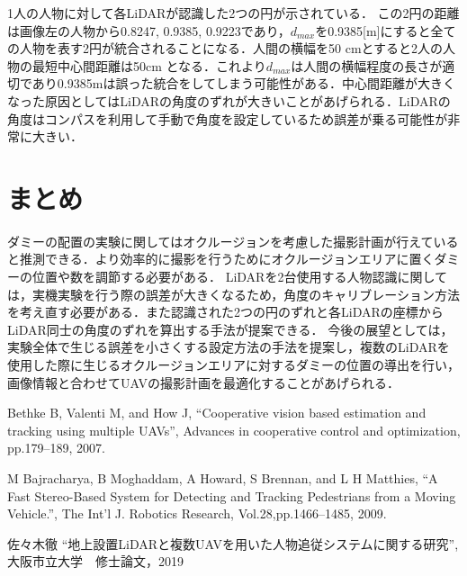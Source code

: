 \documentclass[autodetect-engine,dvipdfmx-if-dvi,ja=standard,a4j,jbase=10.5pt,twoside,twocolumn,magstyle=nomag*]{bxjsarticle}
\begin{document}
1人の人物に対して各LiDARが認識した2つの円が示されている．
この2円の距離は画像左の人物から0.8247, 0.9385, 0.9223であり，$d_{max}$を0.9385[m]にすると全ての人物を表す2円が統合されることになる．人間の横幅を50	cmとすると2人の人物の最短中心間距離は50cm となる．これより$d_{max}$は人間の横幅程度の長さが適切であり0.9385mは誤った統合をしてしまう可能性がある．中心間距離が大きくなった原因としてはLiDARの角度のずれが大きいことがあげられる．LiDARの角度はコンパスを利用して手動で角度を設定しているため誤差が乗る可能性が非常に大きい．

\section{まとめ}
ダミーの配置の実験に関してはオクルージョンを考慮した撮影計画が行えていると推測できる．より効率的に撮影を行うためにオクルージョンエリアに置くダミーの位置や数を調節する必要がある．
LiDARを2台使用する人物認識に関しては，実機実験を行う際の誤差が大きくなるため，角度のキャリブレーション方法を考え直す必要がある．また認識された2つの円のずれと各LiDARの座標からLiDAR同士の角度のずれを算出する手法が提案できる．
今後の展望としては，実験全体で生じる誤差を小さくする設定方法の手法を提案し，複数のLiDARを使用した際に生じるオクルージョンエリアに対するダミーの位置の導出を行い，画像情報と合わせてUAVの撮影計画を最適化することがあげられる．

\begin{thebibliography}{9}

Bethke B, Valenti M, and How J, ``Cooperative vision based estimation and tracking using multiple UAVs'', Advances in cooperative control and optimization, pp.179--189, 2007.

M Bajracharya, B Moghaddam, A Howard, S Brennan, and L H Matthies, ``A Fast Stereo-Based System for Detecting and Tracking Pedestrians from a Moving Vehicle.'', The Int'l J. Robotics Research, Vol.28,pp.1466--1485, 2009.

佐々木徹 ``地上設置LiDARと複数UAVを用いた人物追従システムに関する研究'', 大阪市立大学　修士論文，2019
\end{thebibliography}
\end{document}
